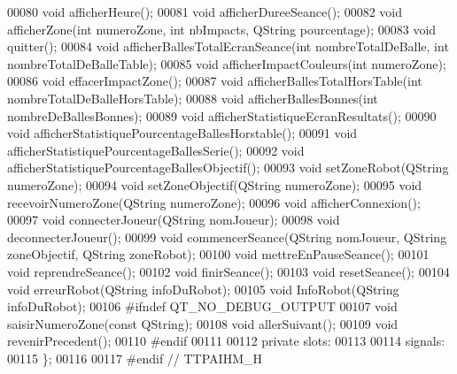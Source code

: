 \begin{DoxyCode}
00080         \textcolor{keywordtype}{void} afficherHeure();
00081         \textcolor{keywordtype}{void} afficherDureeSeance();
00082         \textcolor{keywordtype}{void} afficherZone(\textcolor{keywordtype}{int} numeroZone, \textcolor{keywordtype}{int} nbImpacts, QString pourcentage);
00083         \textcolor{keywordtype}{void} quitter();
00084         \textcolor{keywordtype}{void} afficherBallesTotalEcranSeance(\textcolor{keywordtype}{int} nombreTotalDeBalle, \textcolor{keywordtype}{int} nombreTotalDeBalleTable);
00085         \textcolor{keywordtype}{void} afficherImpactCouleurs(\textcolor{keywordtype}{int} numeroZone);
00086         \textcolor{keywordtype}{void} effacerImpactZone();
00087         \textcolor{keywordtype}{void} afficherBallesTotalHorsTable(\textcolor{keywordtype}{int} nombreTotalDeBalleHorsTable);
00088         \textcolor{keywordtype}{void} afficherBallesBonnes(\textcolor{keywordtype}{int} nombreDeBallesBonnes);
00089         \textcolor{keywordtype}{void} afficherStatistiqueEcranResultats();
00090         \textcolor{keywordtype}{void} afficherStatistiquePourcentageBallesHorstable();
00091         \textcolor{keywordtype}{void} afficherStatistiquePourcentageBallesSerie();
00092         \textcolor{keywordtype}{void} afficherStatistiquePourcentageBallesObjectif();
00093         \textcolor{keywordtype}{void} setZoneRobot(QString numeroZone);
00094         \textcolor{keywordtype}{void} setZoneObjectif(QString numeroZone);
00095         \textcolor{keywordtype}{void} recevoirNumeroZone(QString numeroZone);
00096         \textcolor{keywordtype}{void} afficherConnexion();
00097         \textcolor{keywordtype}{void} connecterJoueur(QString nomJoueur);
00098         \textcolor{keywordtype}{void} deconnecterJoueur();
00099         \textcolor{keywordtype}{void} commencerSeance(QString nomJoueur, QString zoneObjectif, QString zoneRobot);
00100         \textcolor{keywordtype}{void} mettreEnPauseSeance();
00101         \textcolor{keywordtype}{void} reprendreSeance();
00102         \textcolor{keywordtype}{void} finirSeance();
00103         \textcolor{keywordtype}{void} resetSeance();
00104         \textcolor{keywordtype}{void} erreurRobot(QString infoDuRobot);
00105         \textcolor{keywordtype}{void} InfoRobot(QString infoDuRobot);
00106 \textcolor{preprocessor}{    #ifndef QT\_NO\_DEBUG\_OUTPUT}
00107         \textcolor{keywordtype}{void} saisirNumeroZone(\textcolor{keyword}{const} QString);
00108         \textcolor{keywordtype}{void} allerSuivant();
00109         \textcolor{keywordtype}{void} revenirPrecedent();
00110 \textcolor{preprocessor}{    #endif}
00111 
00112     \textcolor{keyword}{private} slots:
00113 
00114     signals:
00115 \};
00116 
00117 \textcolor{preprocessor}{#endif // TTPAIHM\_H}
\end{DoxyCode}
